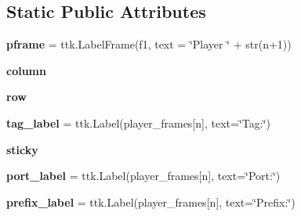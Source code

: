 \subsection*{Static Public Attributes}
\begin{DoxyCompactItemize}
\item 
\mbox{\label{classssbm-py_1_1player__frames_1_1_player_frames_a7a2f37759856e3cce93765622b7a3b72}} 
{\bfseries pframe} = ttk.\+Label\+Frame(f1, text = \char`\"{}Player \char`\"{} + str(n+1))
\item 
\mbox{\label{classssbm-py_1_1player__frames_1_1_player_frames_aa7698f4badef11bc0606a7cda1c124c2}} 
{\bfseries column}
\item 
\mbox{\label{classssbm-py_1_1player__frames_1_1_player_frames_ac09e048f5b118386c53ff2d8e8828abe}} 
{\bfseries row}
\item 
\mbox{\label{classssbm-py_1_1player__frames_1_1_player_frames_ac8db1b1947670dcf20d114e37be97b9e}} 
{\bfseries tag\+\_\+label} = ttk.\+Label(player\+\_\+frames\mbox{[}n\mbox{]}, text=\char`\"{}Tag\+:\char`\"{})
\item 
\mbox{\label{classssbm-py_1_1player__frames_1_1_player_frames_a8b8980e25b1b9144a291383bb08580a6}} 
{\bfseries sticky}
\item 
\mbox{\label{classssbm-py_1_1player__frames_1_1_player_frames_a688e7fe72b1c20c559befb48ade737ca}} 
{\bfseries port\+\_\+label} = ttk.\+Label(player\+\_\+frames\mbox{[}n\mbox{]}, text=\char`\"{}Port\+:\char`\"{})
\item 
\mbox{\label{classssbm-py_1_1player__frames_1_1_player_frames_a77dc90afb6763d2bc15f552a5a4849c6}} 
{\bfseries prefix\+\_\+label} = ttk.\+Label(player\+\_\+frames\mbox{[}n\mbox{]}, text=\char`\"{}Prefix\+:\char`\"{})
\item 
\mbox{\label{classssbm-py_1_1player__frames_1_1_player_frames_a2e25cc369bcde0cdd551bd752ba909ad}} 

\end{DoxyCompactItemize}
